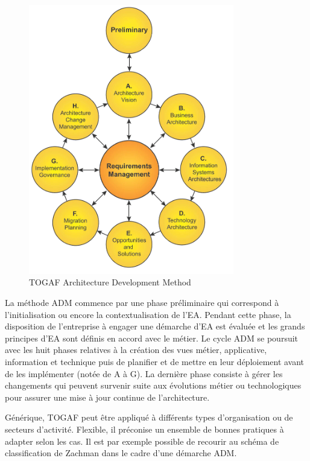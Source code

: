 \begin{description}
\begin{figure}[!htbp]
 \begin{center}
  \includegraphics[width=0.8\textwidth]{images/Chapitre1/TOGAF9_Wheel.png}
 \end{center}
 \caption{TOGAF Architecture Development Method  \protect\cite{togaf2009}}
 \label{fig:TOGAF}
\end{figure}

La méthode ADM commence par une phase préliminaire qui correspond à l'initialisation ou encore la contextualisation de l'EA. Pendant cette phase, la disposition de l'entreprise à engager une démarche d'EA est évaluée et les grands principes d'EA sont définis en accord avec le métier. Le cycle ADM se poursuit avec les huit phases relatives à la création des vues métier, applicative, information et technique puis de planifier et de mettre en leur déploiement avant de les implémenter (notée de A à G). La dernière phase consiste à gérer les changements qui peuvent survenir suite aux évolutions métier ou technologiques pour assurer une mise à jour continue de l'architecture. 

Générique, TOGAF peut être appliqué à différents types d'organisation ou de secteurs d'activité. Flexible, il préconise  un ensemble de bonnes pratiques à adapter selon les cas. Il est par exemple possible de recourir au schéma de classification de Zachman dans le cadre d'une démarche ADM.


\end{description}
